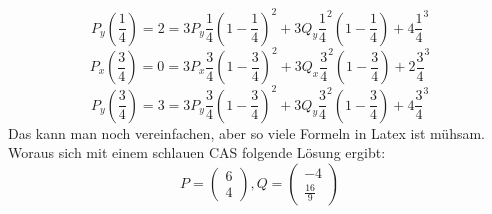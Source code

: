 \begin{displaymath}
P_y\left(\frac{1}{4}\right) = 2 = 3 P_y \frac{1}{4}\left(1-\frac{1}{4}\right)^2+3Q_y\frac{1}{4}^2\left(1-\frac{1}{4}\right)+4\frac{1}{4}^3
\end{displaymath}
\begin{displaymath}
P_x\left(\frac{3}{4}\right) = 0 = 3 P_x \frac{3}{4}\left(1-\frac{3}{4}\right)^2+3Q_x\frac{3}{4}^2\left(1-\frac{3}{4}\right)+2\frac{3}{4}^3
\end{displaymath}
\begin{displaymath}
P_y\left(\frac{3}{4}\right) = 3 = 3 P_y \frac{3}{4}\left(1-\frac{3}{4}\right)^2+3Q_y\frac{3}{4}^2\left(1-\frac{3}{4}\right)+4\frac{3}{4}^3
\end{displaymath}
Das kann man noch vereinfachen, aber so viele Formeln in Latex ist mühsam. Woraus sich mit einem schlauen CAS folgende Lösung ergibt:
\begin{displaymath}
P = \begin{pmatrix}6 \\ 4\end{pmatrix}, Q = \begin{pmatrix}-4 \\ \frac{16}{9}\end{pmatrix}
\end{displaymath}